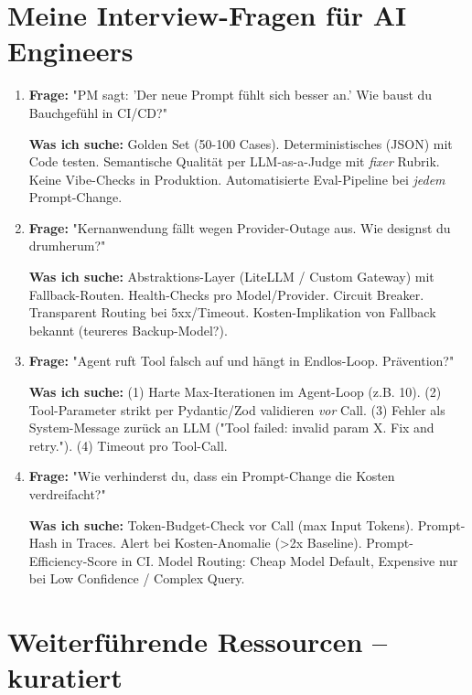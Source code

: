 \section{Meine Interview-Fragen für AI Engineers}

\begin{enumerate}[leftmargin=*]
    \item \textbf{Frage:} "PM sagt: 'Der neue Prompt fühlt sich besser an.' Wie baust du Bauchgefühl in CI/CD?"
    
    \textbf{Was ich suche:} Golden Set (50-100 Cases). Deterministisches (JSON) mit Code testen. Semantische Qualität per LLM-as-a-Judge mit \textit{fixer} Rubrik. Keine Vibe-Checks in Produktion. Automatisierte Eval-Pipeline bei \textit{jedem} Prompt-Change.
    
    \item \textbf{Frage:} "Kernanwendung fällt wegen Provider-Outage aus. Wie designst du drumherum?"
    
    \textbf{Was ich suche:} Abstraktions-Layer (LiteLLM / Custom Gateway) mit Fallback-Routen. Health-Checks pro Model/Provider. Circuit Breaker. Transparent Routing bei 5xx/Timeout. Kosten-Implikation von Fallback bekannt (teureres Backup-Model?).
    
    \item \textbf{Frage:} "Agent ruft Tool falsch auf und hängt in Endlos-Loop. Prävention?"
    
    \textbf{Was ich suche:} (1) Harte Max-Iterationen im Agent-Loop (z.B. 10). (2) Tool-Parameter strikt per Pydantic/Zod validieren \textit{vor} Call. (3) Fehler als System-Message zurück an LLM ("Tool failed: invalid param X. Fix and retry."). (4) Timeout pro Tool-Call.
    
    \item \textbf{Frage:} "Wie verhinderst du, dass ein Prompt-Change die Kosten verdreifacht?"
    
    \textbf{Was ich suche:} Token-Budget-Check vor Call (max Input Tokens). Prompt-Hash in Traces. Alert bei Kosten-Anomalie (>2x Baseline). Prompt-Efficiency-Score in CI. Model Routing: Cheap Model Default, Expensive nur bei Low Confidence / Complex Query.
\end{enumerate}

\section{Weiterführende Ressourcen -- kuratiert}

